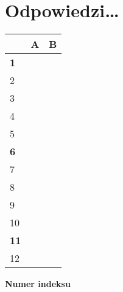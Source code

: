 \documentclass[journal,9pt,final,a4paper]{IEEEtran}%
\begin{document}
\section{Odpowiedzi\ldots}

\begin{center}%
\begin{tabular}
[c]{|l|l|l|}\hline
& A & B\\\hline\hline
\textbf{1} &  & \\\hline
2 &  & \\\hline
3 &  & \\\hline
4 &  & \\\hline
5 &  & \\\hline
\textbf{6} &  & \\\hline
7 &  & \\\hline
8 &  & \\\hline
9 &  & \\\hline
10 &  & \\\hline
\textbf{11} &  & \\\hline
12 &  & \\\hline
\end{tabular}
\vspace*{0.5in}

\textbf{Numer indeksu}%

\begin{tabular}
[c]{|l|l|l|l|l|l|}\hline
&  &  &  &  & \\\hline
\end{tabular}

\end{center}
\end{document}
